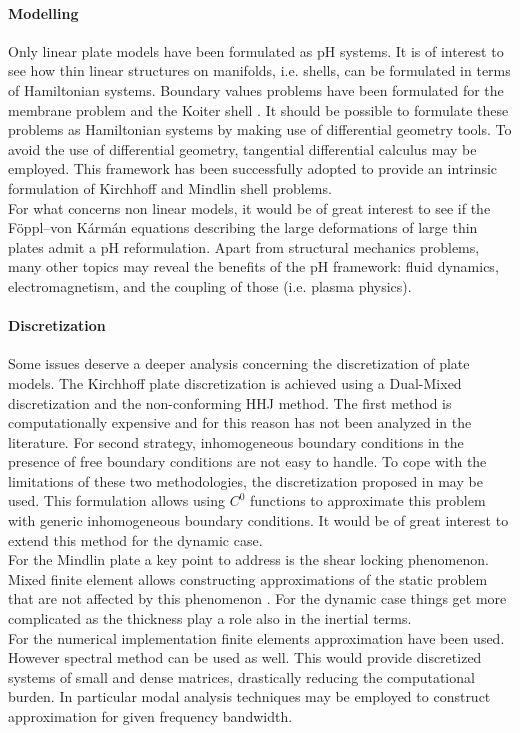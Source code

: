 \paragraph{Modelling}
Only linear plate models have been formulated as pH systems. It is of interest to see how thin linear structures on manifolds, i.e. shells, can be formulated in terms of Hamiltonian systems. Boundary values problems have been formulated for the membrane problem and the Koiter shell \cite{ciarlet2000shells}. It should be possible to formulate these problems as Hamiltonian systems by making use of differential geometry tools. To avoid the use of differential geometry, tangential differential calculus \cite{delfour2011shapes} may be employed. This framework has been successfully adopted to provide an intrinsic formulation of Kirchhoff \cite{schollhammer2019kirchhoff} and Mindlin \cite{schollhammer2019reissner} shell problems. \\
For what concerns non linear models, it would be of great interest to see if the F\"oppl–von K\'arm\'an equations describing the large deformations of large thin plates \cite{bilbao2015conservative} admit a pH reformulation. Apart from structural mechanics problems, many other topics may reveal the benefits of the pH framework: fluid dynamics, electromagnetism, and the coupling of those (i.e. plasma physics).


\paragraph{Discretization}
Some issues deserve a deeper analysis concerning the discretization of plate models. The Kirchhoff plate discretization is achieved using a Dual-Mixed discretization and the non-conforming HHJ method. The first method is computationally expensive and for this reason has not been analyzed in the literature. For second strategy, inhomogeneous boundary conditions in the presence of free boundary conditions are not easy to handle. To cope with the limitations of these two methodologies, the discretization proposed in \cite{rafetseder2018siam} may be used.  This formulation allows using $C^0$ functions to approximate this problem with generic inhomogeneous boundary conditions. It would be of great interest to extend this method for the dynamic case. \\ For the Mindlin plate a key point to address is the shear locking phenomenon. Mixed finite element allows constructing approximations of the static problem that are not affected by this phenomenon \cite{veiga2013}. For the dynamic case things get more complicated as the thickness play a role also in the inertial terms. \\
For the numerical implementation finite elements approximation have been used. However spectral method can be used as well. This would provide discretized systems of small and dense matrices, drastically reducing the computational burden. In particular modal analysis techniques may be employed to construct approximation for given frequency bandwidth.

